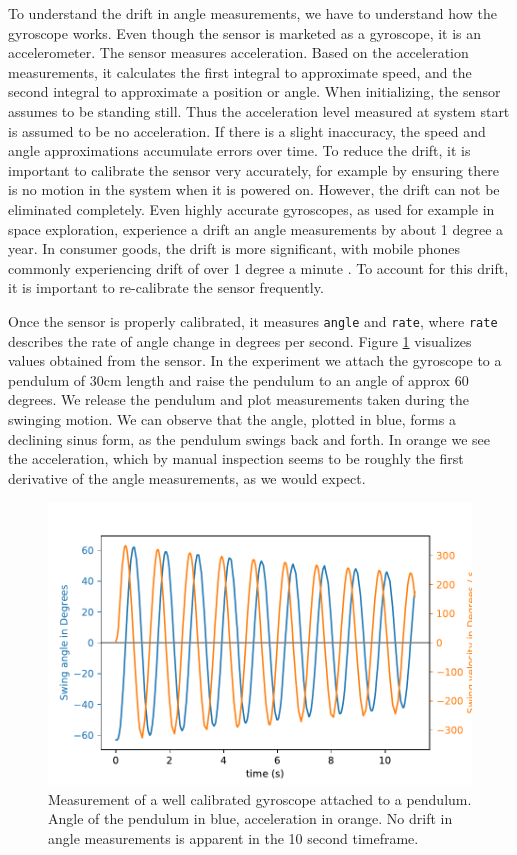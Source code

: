 \documentclass[11pt, a4paper]{article}
\begin{document}
To understand the drift in angle measurements, we have to understand how the gyroscope works. Even though the sensor is marketed as a gyroscope, it is an accelerometer. The sensor measures acceleration. Based on the acceleration measurements, it calculates the first integral to approximate speed, and the second integral to approximate a position or angle. When initializing, the sensor assumes to be standing still. Thus the acceleration level measured at system start is assumed to be no acceleration. If there is a slight inaccuracy, the speed and angle approximations accumulate errors over time. To reduce the drift, it is important to calibrate the sensor very accurately, for example by ensuring there is no motion in the system when it is powered on. However, the drift can not be eliminated completely. Even highly accurate gyroscopes, as used for example in space exploration, experience a drift an angle measurements by about 1 degree a year. In consumer goods, the drift is more significant, with mobile phones commonly experiencing drift of over 1 degree a minute \cite{gyro_drift}. To account for this drift, it is important to re-calibrate the sensor frequently.

Once the sensor is properly calibrated, it measures \texttt{angle} and \texttt{rate}, where \texttt{rate} describes the rate of angle change in degrees per second. Figure \ref{fig:pendulum} visualizes values obtained from the sensor. In the experiment we attach the gyroscope to a pendulum of $30$cm length and raise the pendulum to an angle of approx 60 degrees. We release the pendulum and plot measurements taken during the swinging motion. We can observe that the angle, plotted in blue, forms a declining sinus form, as the pendulum swings back and forth. In orange we see the acceleration, which by manual inspection seems to be roughly the first derivative of the angle measurements, as we would expect.

\begin{figure}
\centering
\includegraphics[width=0.6\linewidth]{images/pendulum}
\caption{Measurement of a well calibrated gyroscope attached to a pendulum. Angle of the pendulum in blue, acceleration in orange. No drift in angle measurements is apparent in the 10 second timeframe.}
\label{fig:pendulum}
\end{figure}
\end{document}
